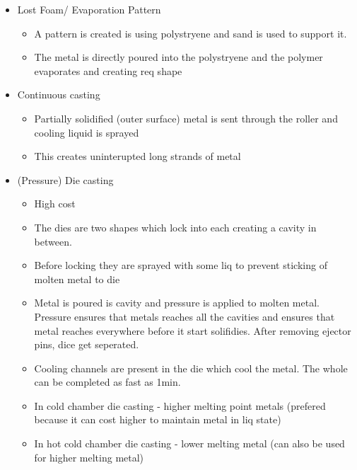 \documentclass{article}
\begin{document}
\begin{itemize}
\item Lost Foam/ Evaporation Pattern
	\begin{itemize}
	\item A pattern is created is using polystryene and sand is used to support it.
	\item The metal is directly poured into the polystryene and the polymer evaporates and creating req shape
	\end{itemize}


\item Continuous casting
	\begin{itemize}
	\item Partially solidified (outer surface) metal is sent through the roller and cooling liquid is sprayed
	\item This creates uninterupted long strands of metal
	\end{itemize}


 \item (Pressure) Die casting
 	\begin{itemize}
 	\item High cost
 	\item The dies are two shapes which lock into each creating a cavity in between. 
 	\item Before locking they are sprayed with some liq to prevent sticking of molten metal to die
 	\item Metal is poured is cavity and pressure is applied to molten metal. Pressure ensures that metals reaches all the cavities and ensures that metal reaches everywhere before it start solifidies. After removing ejector pins, dice get seperated.
 	\item Cooling channels are present in the die which cool the metal. The whole can be completed as fast as 1min.
 	\item In cold chamber die casting - higher melting point metals (prefered because it can cost higher to maintain metal in liq state) 
 	\item In hot cold chamber die casting - lower melting metal (can also be used for higher melting metal)
	\end{itemize}


\end{itemize}
\end{document}
